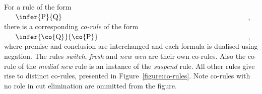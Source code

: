 \documentclass[UKenglish,acmsmall,authorversion]{acmart}
\theoremstyle{plain}
\begin{document}

For a rule of the form $\vcenter{\infer{P}{Q}}$, there is a  corresponding \textit{co-rule} of the form $\vcenter{\infer{\co{Q}}{\co{P}}}$, where premise and conclusion are interchanged and each formula is dualised using negation. 
The rules \textit{switch}, \textit{fresh} and \textit{new wen} are their own co-rules. 
Also the co-rule of the \textit{medial new} rule is an instance of the \textit{suspend} rule.
All other rules give rise to distinct co-rules, presented in Figure~\ref{figure:co-rules}.
Note co-rules with no role in cut elimination are ommitted from the figure.
\end{document}
